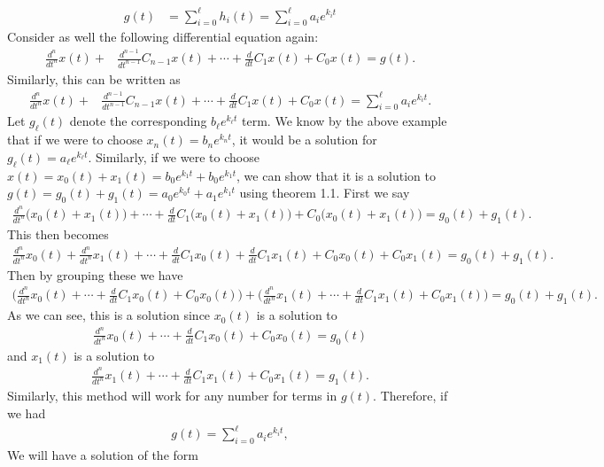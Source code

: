 \begin{align}
g(t)&=\sum_{i=0}^{\ell}h_i(t)=\sum_{i=0}^{\ell}a_i e^{k_i t}
\end{align}
Consider as well the following differential equation again:
\begin{align}
\frac{d^n}{dt^n}x(t)+&\frac{d^{n-1}}{dt^{n-1}}C_{n-1}x(t)+\cdots+\frac{d}{dt}C_1x(t)+C_0x(t)=g(t).
\end{align} 
Similarly, this can be written as
\begin{align}
\frac{d^n}{dt^n}x(t)+&\frac{d^{n-1}}{dt^{n-1}}C_{n-1}x(t)+\cdots+\frac{d}{dt}C_1x(t)+C_0x(t)=\sum_{i=0}^{\ell}a_i e^{k_i t}. 
\end{align}
Let $g_\ell(t)$ denote the corresponding $b_\ell e^{k_\ell t}$ term. We know by the above example that if we were to choose $x_n(t)=b_ne^{k_nt}$, it would be a solution for $g_\ell(t)=a_\ell e^{k_\ell t}$. Similarly, if we were to choose $x(t)=x_0(t)+x_1(t)=b_0e^{k_1t}+b_0e^{k_1t}$, we can show that it is a solution to $g(t)=g_0(t)+g_1(t)=a_0e^{k_0t}+a_1e^{k_1t}$ using theorem 1.1. First we say
\begin{align}
\frac{d^n}{dt^n}\big(x_0(t)+x_1(t) \big)+\cdots+\frac{d}{dt}C_1\big(x_0(t)+x_1(t) \big)+C_0\big(x_0(t)+x_1(t) \big)=g_0(t)+g_1(t).
\end{align}
This then becomes
\begin{align}
\frac{d^n}{dt^n}x_0(t)+\frac{d^n}{dt^n}x_1(t)+\cdots+\frac{d}{dt}C_1x_0(t)+\frac{d}{dt}C_1x_1(t) +C_0x_0(t)+C_0x_1(t)=g_0(t)+g_1(t).
\end{align}
Then by grouping these we have
\begin{align*}
\bigg(\frac{d^n}{dt^n}x_0(t)+\cdots+\frac{d}{dt}C_1x_0(t) +C_0x_0(t)\bigg) +\bigg(\frac{d^n}{dt^n}x_1(t)+\cdots+\frac{d}{dt}C_1x_1(t)+C_0x_1(t) \bigg)=g_0(t)+g_1(t).
\end{align*}
As we can see, this is a solution since $x_0(t)$ is a solution to
\begin{align}
\frac{d^n}{dt^n}x_0(t)+\cdots+\frac{d}{dt}C_1x_0(t) +C_0x_0(t)=g_0(t)
\end{align}
and $x_1(t)$ is a solution to
\begin{align}
\frac{d^n}{dt^n}x_1(t)+\cdots+\frac{d}{dt}C_1x_1(t)+C_0x_1(t) =g_1(t).
\end{align}
Similarly, this method will work for any number for terms in $g(t)$. Therefore, if we had
\begin{align}
g(t)=\sum_{i=0}^{\ell}a_i e^{k_i t},
\end{align}
We will have a solution of the form
